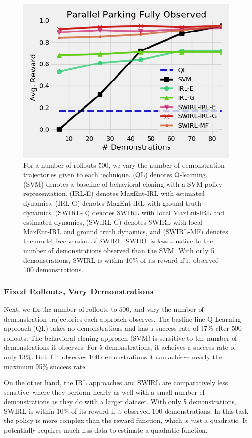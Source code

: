\begin{figure}[t]
\centering
 \includegraphics[width=0.8\columnwidth]{new-exp/pp-fo2.png}
 \caption{For a number of rollouts $500$, we vary the number of demonstration trajectories given to each technique. (QL) denotes Q-learning, (SVM) denotes a baseline of behavioral cloning with a SVM policy representation, (IRL-E) denotes MaxEnt-IRL with estimated dynamics, (IRL-G) denotes MaxEnt-IRL with ground truth dynamics, (SWIRL-E) denotes SWIRL with local MaxEnt-IRL and estimated dynamics, (SWIRL-G) denotes SWIRL with local MaxEnt-IRL and ground truth dynamics, and (SWIRL-MF) denotes the model-free version of SWIRL. SWIRL is less senstive to the number of demonstrations observed than the SVM. With only 5 demonstrations, SWIRL is within 10\% of its reward if it observed 100 demonstrations. \label{exp:pp-fo2}}
\end{figure}

\subsubsection{Fixed Rollouts, Vary Demonstrations}
Next, we fix the number of rollouts to $500$, and vary the number of demonstration trajectories each approach observes.
The basline line Q-Learning approach (QL) takes no demonstrations and has a success rate of 17\% after 500 rollouts.
The behavioral cloning approach (SVM) is sensitive to the number of demonstrations it observes. 
For 5 demonstrations, it acheives a success rate of only 13\%.
But if it observes 100 demonstrations it can achieve nearly the maximum 95\% success rate.

On the other hand, the IRL approaches and SWIRL are comparatively less sensitive--where they perform nearly as well with a small number of demonstrations as they do with a larger dataset.
With only 5 demonstrations, SWIRL is within 10\% of its reward if it observed 100 demonstrations.
In this task the policy is more complex than the reward function, which is just a quadratic.
It potentially requires much less data to estimate a quadratic function.

